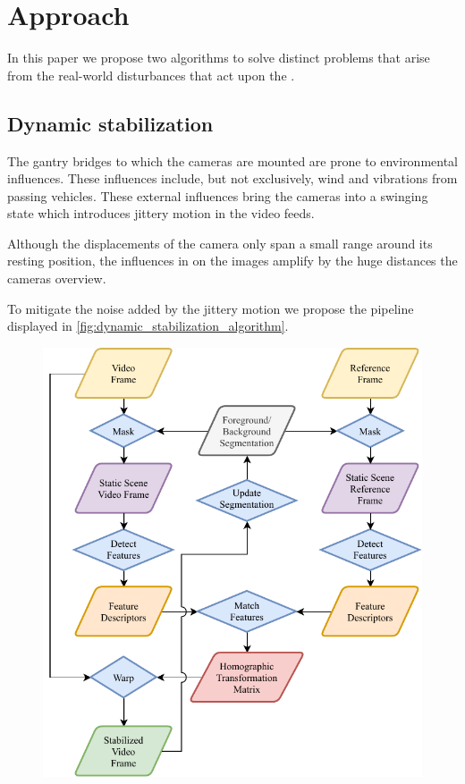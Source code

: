 
\section{Approach}
In this paper we propose two algorithms to solve distinct problems that arise from the real-world disturbances that act upon the \ITS{}.

\subsection{Dynamic stabilization}
The gantry bridges to which the cameras are mounted are prone to environmental influences. 
These influences include, but not exclusively, wind and vibrations from passing vehicles.
These external influences bring the cameras into a swinging state which introduces jittery motion in the video feeds.

Although the displacements of the camera only span a small range around its resting position, the influences in on the images amplify by the huge distances the cameras overview.

To mitigate the noise added by the jittery motion we propose the pipeline displayed in \autoref{fig:dynamic_stabilization_algorithm}.

\begin{figure}[t]
  \begin{center}
     \includegraphics[width=0.8\linewidth]{diagrams/DynamicStabilization.pdf}
  \end{center}
     \caption{}
  \label{fig:dynamic_stabilization_algorithm}
  \end{figure}

